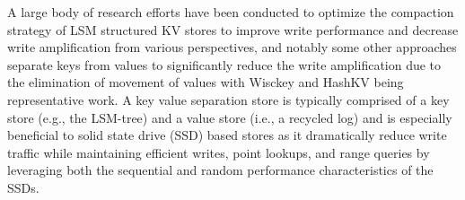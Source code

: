 \documentclass[sigconf]{acmart}
\begin{document}

A large body of research efforts have been conducted to optimize the compaction strategy of LSM structured KV stores to improve write performance \cite{HyperLevelDB,bLSM,PCP,cLSM,CM} and decrease write amplification \cite{LSMtrie,skiptree,LWCtree,TRIAD} from various perspectives, and notably  some other approaches separate keys from values to significantly reduce the write amplification due to the elimination of movement of values with Wisckey \cite{Wisckey} and HashKV \cite{HashKV} being representative work. A key value separation store is typically comprised of a key store (e.g., the LSM-tree) and a value store (i.e., a recycled log) and is especially beneficial to solid state drive (SSD) based stores as it dramatically reduce write traffic while maintaining efficient writes, point lookups, and range queries by leveraging both the sequential and random performance characteristics of the SSDs. 

\end{document}
